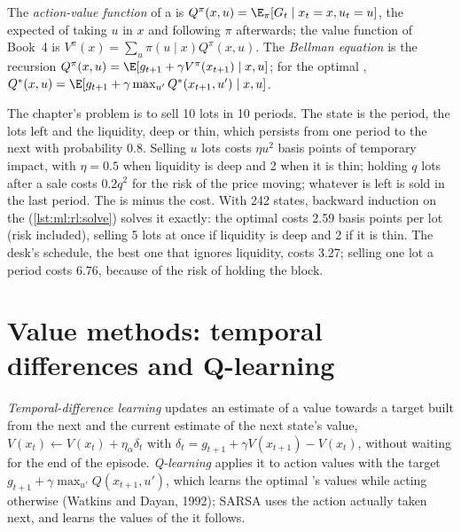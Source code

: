 \begin{definition}\label{def:ml:reinforcement-learning-foundations:bellman}
The \emph{action-value function} of a  is $Q^\pi(x, u) = \E_\pi[G_t\mid x_t = x, u_t = u]$,
the expected  of taking $u$ in $x$ and following $\pi$ afterwards; the value function of Book~4 is $V^\pi(x)
= \sum_u\pi(u\mid x)Q^\pi(x, u)$. The \emph{Bellman equation} is the recursion $Q^\pi(x, u) =
\E[g_{t+1} + \gamma V^\pi(x_{t+1})\mid x, u]$; for the optimal , $Q^*(x, u) = \E[g_{t+1} + \gamma\max_{u'}Q^*(x_{t+1},
u')\mid x, u]$.
\end{definition}

The chapter's problem is to sell 10 lots in 10 periods. The state is the period, the lots left and the liquidity, deep or
thin, which persists from one period to the next with probability 0.8. Selling $u$ lots costs $\eta u^2$ basis points of
temporary impact, with $\eta = 0.5$ when liquidity is deep and 2 when it is thin; holding $q$ lots after a sale costs $0.2
q^2$ for the risk of the price moving; whatever is left is sold in the last period. The  is minus the cost. With 242
states, backward induction on the  (\cref{lst:ml:rl:solve}) solves it exactly: the optimal  costs
2.59 basis points per lot (risk included), selling 5 lots at once if liquidity is deep and 2 if it is thin. The desk's
schedule, the best one that ignores liquidity, costs 3.27; selling one lot a period costs 6.76, because of the risk of
holding the block.

\section{Value methods: temporal differences and Q-learning}

\begin{definition}\label{def:ml:reinforcement-learning-foundations:td}
\emph{Temporal-difference learning} updates an estimate of a value towards a target built
from the next  and the current estimate of the next state's value, $V(x_t)\leftarrow V(x_t) + \eta_\alpha\delta_t$ with
$\delta_t = g_{t+1} + \gamma V(x_{t+1}) - V(x_t)$, without waiting for the end of the episode. \emph{Q-learning}
applies it to action values with the target $g_{t+1} + \gamma\max_{u'}Q(x_{t+1}, u')$, which learns the optimal 's values
while acting otherwise (Watkins and Dayan, 1992); SARSA uses the action actually taken next, and learns the values of the
 it follows.
\end{definition}

